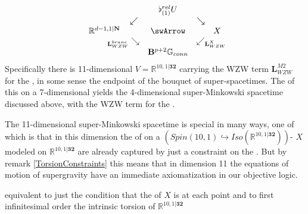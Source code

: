 \documentclass[12pt,titlepage]{article}
\def\mathllap{\mathpalette\mathllapinternal}
\def\mathrlap{\mathpalette\mathrlapinternal}
\def\mathllapinternal#1#2{\llap{$\mathsurround=0pt#1{#2}$}}
\def\mathrlapinternal#1#2{\rlap{$\mathsurround=0pt#1{#2}$}}
\newcommand{\itexarray}[1]{\begin{matrix}#1\end{matrix}}
\theoremstyle{plain}
\theoremstyle{definition}
\theoremstyle{remark}
\begin{document}
\begin{displaymath}
\itexarray{
     && \flat^{rel}_{(1)} U
     \\
     & \swarrow && \searrow
     \\
     \mathbb{R}^{d-1,1|\mathbf{N}}
     && \swArrow &&
     X
     \\
     & {}_{\mathllap{\mathbf{L}_{WZW}^{brane}}}\searrow && \swarrow_{\mathrlap{\mathbf{L}_{WZW}^X}}
     \\
     && \mathbf{B}^{p+2}\mathbb{G}_{conn}
  }
\end{displaymath}
Specifically there is 11-dimensional  $V = \mathbb{R}^{10,1\vert \mathbf{32}}$ carrying the WZW term $\mathbf{L}_{WZW}^{M2}$ for the , in some sense the endpoint of the bouquet of super-spacetimes. The  of this on a 7-dimensional  yields the 4-dimensional super-Minkowski spacetime discussed above, with the WZW term for the .

The 11-dimensional super-Minkowski spacetime is special in many ways, one of which is that in this dimension the  of  on a $(Spin(10,1)\hookrightarrow Iso(\mathbb{R}^{10,1\vert \mathbf{32}}))$- $X$ modeled on $\mathbb{R}^{10,1\vert \mathbf{32}}$ are already captured by just a constraint on the . But by remark \ref{TorsionConstraints} this means that in dimension 11 the equations of motion of supergravity have an immediate axiomatization in our objective logic.

equivalent to just the condition that the of $X$ is at each point and to first infinitesimal order the intrinsic torsion of $\mathbb{R}^{10,1\vert \mathbf{32}}$
\end{document}
